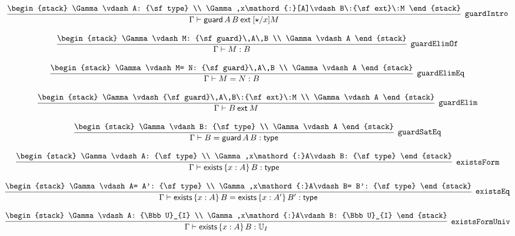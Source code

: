\[
\infer[{\tt guardIntro}]{\Gamma \vdash {\sf guard}\,A\,B\:{\sf ext}\:[\star /x]M}{
\begin{stack}
\Gamma \vdash A: {\sf type}
\\
\Gamma ,x\mathord{:}[A]\vdash B\:{\sf ext}\:M
\end{stack}}
\]

\[
\infer[{\tt guardElimOf}]{\Gamma \vdash M: B}{
\begin{stack}
\Gamma \vdash M: {\sf guard}\,A\,B
\\
\Gamma \vdash A
\end{stack}}
\]

\[
\infer[{\tt guardElimEq}]{\Gamma \vdash M= N: B}{
\begin{stack}
\Gamma \vdash M= N: {\sf guard}\,A\,B
\\
\Gamma \vdash A
\end{stack}}
\]

\[
\infer[{\tt guardElim}]{\Gamma \vdash B\:{\sf ext}\:M}{
\begin{stack}
\Gamma \vdash {\sf guard}\,A\,B\:{\sf ext}\:M
\\
\Gamma \vdash A
\end{stack}}
\]

\[
\infer[{\tt guardSatEq}]{\Gamma \vdash B= {\sf guard}\,A\,B: {\sf type}}{
\begin{stack}
\Gamma \vdash B: {\sf type}
\\
\Gamma \vdash A
\end{stack}}
\]

\[
\infer[{\tt existsForm}]{\Gamma \vdash {\sf exists}\,\{x : A\}\,B: {\sf type}}{
\begin{stack}
\Gamma \vdash A: {\sf type}
\\
\Gamma ,x\mathord{:}A\vdash B: {\sf type}
\end{stack}}
\]

\[
\infer[{\tt existsEq}]{\Gamma \vdash {\sf exists}\,\{x : A\}\,B= {\sf exists}\,\{x : A'\}\,B': {\sf type}}{
\begin{stack}
\Gamma \vdash A= A': {\sf type}
\\
\Gamma ,x\mathord{:}A\vdash B= B': {\sf type}
\end{stack}}
\]

\[
\infer[{\tt existsFormUniv}]{\Gamma \vdash {\sf exists}\,\{x : A\}\,B: {\Bbb U}_{I}}{
\begin{stack}
\Gamma \vdash A: {\Bbb U}_{I}
\\
\Gamma ,x\mathord{:}A\vdash B: {\Bbb U}_{I}
\end{stack}}
\]

